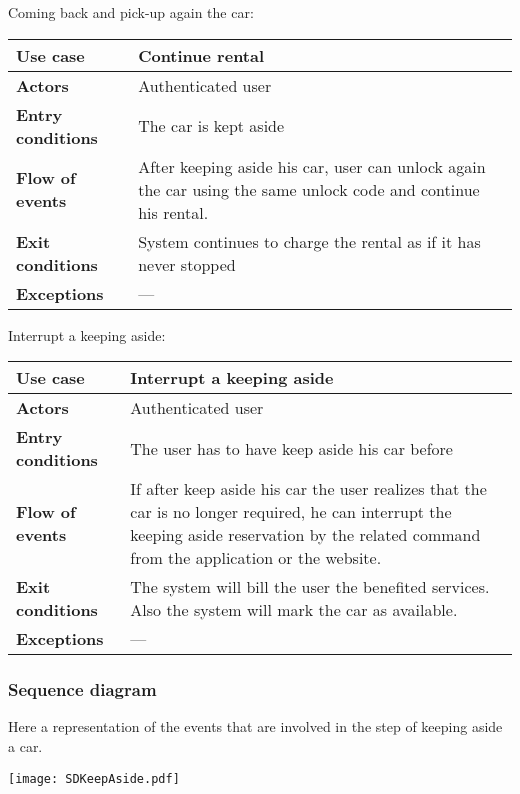 \documentclass{scrreprt}
\begin{document}
Coming back and pick-up again the car:

\begin{center}
\begin{tabularx}{\columnwidth}{>{\bfseries}lX}
\toprule
Use case & Continue rental\\
\midrule
Actors & Authenticated user\\
\midrule
Entry conditions & The car is kept aside\\
\midrule
Flow of events & After keeping aside his car, user can unlock again the car using the same unlock code and continue his rental.\\
\midrule
Exit conditions & System continues to charge the rental as if it has never stopped\\
\midrule
Exceptions & ---\\
\bottomrule
\end{tabularx}
\end{center}

Interrupt a keeping aside:

\begin{center}
\begin{tabularx}{\columnwidth}{>{\bfseries}lX}
\toprule
Use case & Interrupt a keeping aside\\
\midrule
Actors & Authenticated user\\
\midrule
Entry conditions & The user has to have keep aside his car before\\
\midrule
Flow of events & If after keep aside his car the user realizes that the car is no longer required, he can interrupt the keeping aside reservation by the related command from the application or the website.\\
\midrule
Exit conditions & The system will bill the user the benefited services. Also the system will mark the car as available. \\
\midrule
Exceptions & ---\\
\bottomrule
\end{tabularx}
\end{center}


\subsubsection{Sequence diagram}
Here a representation of the events that are involved in the step of keeping aside a car.
\begin{center}
\texttt{[image: SDKeepAside.pdf]}
\end{center}
\end{document}
